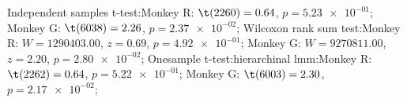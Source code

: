 Independent samples t-test:Monkey R: $\t(2260) = 0.64$, $p = \num{5.23e-01}$; 
Monkey G: $\t(6038) = 2.26$, $p = \num{2.37e-02}$; 
Wilcoxon rank sum test:Monkey R: $W = 1290403.00$, $z = 0.69$, $p = \num{4.92e-01}$; 
Monkey G: $W = 9270811.00$, $z = 2.20$, $p = \num{2.80e-02}$; 
Onesample t-test:hierarchinal lmm:Monkey R: $\t(2262) = 0.64$, $p = \num{5.22e-01}$; 
Monkey G: $\t(6003) = 2.30$, $p = \num{2.17e-02}$; 
